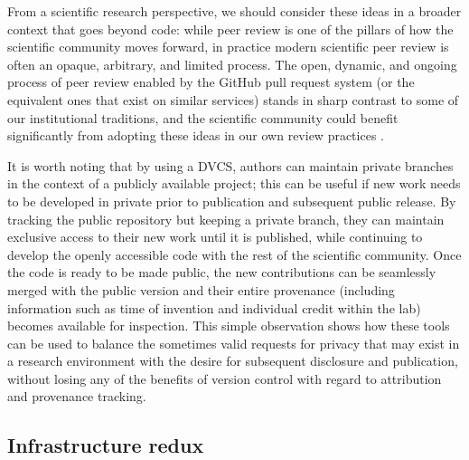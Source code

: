 \documentclass[11pt,oneside,english]{article}
\begin{document}
From a scientific research perspective, we should consider these ideas in a
broader context that goes beyond code: while peer review is one of the pillars
of how the scientific community moves forward, in practice modern scientific
peer review is often an opaque, arbitrary, and limited process.  The open,
dynamic, and ongoing process of peer review enabled by the GitHub pull request
system (or the equivalent ones that exist on similar services) stands in sharp
contrast to some of our institutional traditions, and the scientific community
could benefit significantly from adopting these ideas in our own review
practices \cite{10.3389/fncom.2012.00018}.

It is worth noting that by using a DVCS, authors can maintain private branches
in the context of a publicly available project; this can be useful if new work
needs to be developed in private prior to publication and subsequent public
release. By tracking the public repository but keeping a private branch, they
can maintain exclusive access to their new work until it is published, while
continuing to develop the openly accessible code with the rest of the
scientific community. Once the code is ready to be made public, the new
contributions can be seamlessly merged with the public version and their entire
provenance (including information such as time of invention and individual
credit within the lab) becomes available for inspection.  This simple
observation shows how these tools can be used to balance the sometimes valid
requests for privacy that may exist in a research environment with the desire
for subsequent disclosure and publication, without losing any of the benefits
of version control with regard to attribution and provenance tracking.

\subsection{Infrastructure redux}
\end{document}
